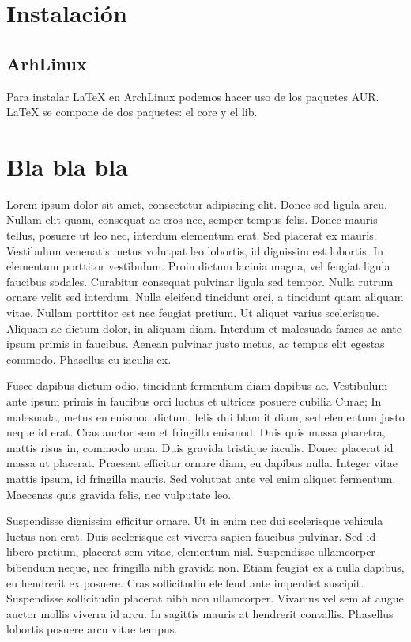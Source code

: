 \documentclass[a4paper]{article}
\begin{document}
    \section{Instalación}
    \subsection{ArhLinux}
    Para instalar LaTeX en ArchLinux podemos hacer uso de los paquetes AUR.
    LaTeX se compone de dos paquetes:\hspace{.5cm} el core y el lib.
    \newpage
    \section{Bla bla bla}
    Lorem ipsum dolor sit amet, consectetur adipiscing elit. Donec sed ligula arcu. Nullam elit quam, consequat ac eros nec, semper tempus felis. Donec mauris tellus, posuere ut leo nec, interdum elementum erat. Sed placerat ex mauris. Vestibulum venenatis metus volutpat leo lobortis, id dignissim est lobortis. In elementum porttitor vestibulum. Proin dictum lacinia magna, vel feugiat ligula faucibus sodales. Curabitur consequat pulvinar ligula sed tempor. Nulla rutrum ornare velit sed interdum. Nulla eleifend tincidunt orci, a tincidunt quam aliquam vitae. Nullam porttitor est nec feugiat pretium. Ut aliquet varius scelerisque. Aliquam ac dictum dolor, in aliquam diam. Interdum et malesuada fames ac ante ipsum primis in faucibus. Aenean pulvinar justo metus, ac tempus elit egestas commodo. Phasellus eu iaculis ex.

Fusce dapibus dictum odio, tincidunt fermentum diam dapibus ac. Vestibulum ante ipsum primis in faucibus orci luctus et ultrices posuere cubilia Curae; In malesuada, metus eu euismod dictum, felis dui blandit diam, sed elementum justo neque id erat. Cras auctor sem et fringilla euismod. Duis quis massa pharetra, mattis risus in, commodo urna. Duis gravida tristique iaculis. Donec placerat id massa ut placerat. Praesent efficitur ornare diam, eu dapibus nulla. Integer vitae mattis ipsum, id fringilla mauris. Sed volutpat ante vel enim aliquet fermentum. Maecenas quis gravida felis, nec vulputate leo.

Suspendisse dignissim efficitur ornare. Ut in enim nec dui scelerisque vehicula luctus non erat. Duis scelerisque est viverra sapien faucibus pulvinar. Sed id libero pretium, placerat sem vitae, elementum nisl. Suspendisse ullamcorper bibendum neque, nec fringilla nibh gravida non. Etiam feugiat ex a nulla dapibus, eu hendrerit ex posuere. Cras sollicitudin eleifend ante imperdiet suscipit. Suspendisse sollicitudin placerat nibh non ullamcorper. Vivamus vel sem at augue auctor mollis viverra id arcu. In sagittis mauris at hendrerit convallis. Phasellus lobortis posuere arcu vitae tempus.
\end{document}
